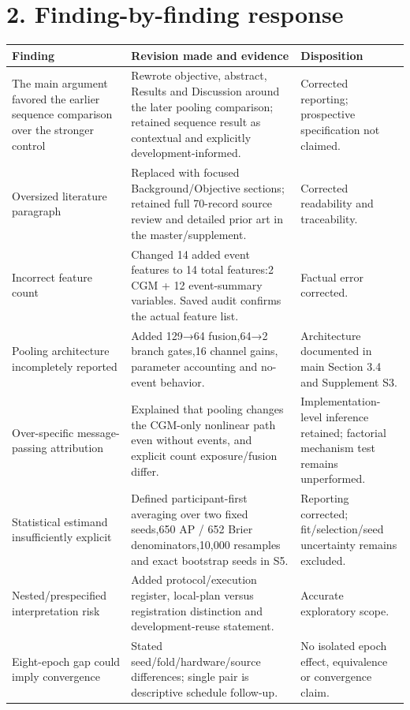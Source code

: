 \documentclass[11pt,a4paper]{article}
\begin{document}
\section*{2. Finding-by-finding response}
{\small
\setlength{\tabcolsep}{3pt}
\begin{longtable}{>{\raggedright\arraybackslash}p{}>{\raggedright\arraybackslash}p{}>{\raggedright\arraybackslash}p{}}
\toprule
\textbf{Finding} & \textbf{Revision made and evidence} & \textbf{Disposition} \\ \midrule
\endhead
The main argument favored the earlier sequence comparison over the stronger control & Rewrote objective, abstract, Results and Discussion around the later pooling comparison; retained sequence result as contextual and explicitly development-informed. & Corrected reporting; prospective specification not claimed. \\
Oversized literature paragraph & Replaced with focused Background/Objective sections; retained full 70-record source review and detailed prior art in the master/supplement. & Corrected readability and traceability. \\
Incorrect feature count & Changed 14 added event features to 14 total features:2 CGM + 12 event-summary variables. Saved audit confirms the actual feature list. & Factual error corrected. \\
Pooling architecture incompletely reported & Added 129→64 fusion,64→2 branch gates,16 channel gains, parameter accounting and no-event behavior. & Architecture documented in main Section 3.4 and Supplement S3. \\
Over-specific message-passing attribution & Explained that pooling changes the CGM-only nonlinear path even without events, and explicit count exposure/fusion differ. & Implementation-level inference retained; factorial mechanism test remains unperformed. \\
Statistical estimand insufficiently explicit & Defined participant-first averaging over two fixed seeds,650 AP / 652 Brier denominators,10,000 resamples and exact bootstrap seeds in S5. & Reporting corrected; fit/selection/seed uncertainty remains excluded. \\
Nested/prespecified interpretation risk & Added protocol/execution register, local-plan versus registration distinction and development-reuse statement. & Accurate exploratory scope. \\
Eight-epoch gap could imply convergence & Stated seed/fold/hardware/source differences; single pair is descriptive schedule follow-up. & No isolated epoch effect, equivalence or convergence claim. \\

\end{longtable}}
\end{document}

